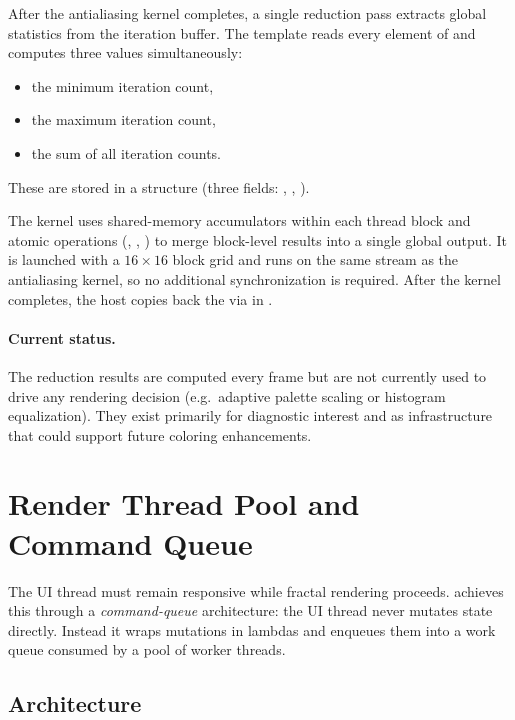 After the antialiasing kernel completes, a single reduction pass
extracts global statistics from the iteration buffer.  The
 template reads every element of
 and computes three values simultaneously:
\begin{itemize}
  \item the minimum iteration count,
  \item the maximum iteration count,
  \item the sum of all iteration counts.
\end{itemize}
These are stored in a  structure
(three  fields: , , ).

The kernel uses shared-memory accumulators within each thread block
and atomic operations (, ,
) to merge block-level results into a single global
output.  It is launched with a $16\times16$ block grid and runs on
the same stream as the antialiasing kernel, so no additional
synchronization is required.  After the kernel completes, the host
copies back the  via  in
.

\paragraph{Current status.}
The reduction results are computed every frame but are not currently
used to drive any rendering decision (e.g.\ adaptive palette scaling
or histogram equalization).  They exist primarily for diagnostic
interest and as infrastructure that could support future coloring
enhancements.


\section{Render Thread Pool and Command Queue}
\label{sec:render-thread-pool}

The UI thread must remain responsive while fractal rendering proceeds.
\FractalShark{} achieves this through a \emph{command-queue} architecture:
the UI thread never mutates  state directly.  Instead it wraps
mutations in lambdas and enqueues them into a work queue consumed by a pool of
worker threads.

\subsection{Architecture}

